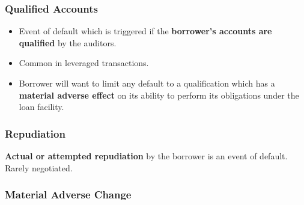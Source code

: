 \documentclass[
]{article}
\providecommand{\tightlist}{%
  \setlength{\itemsep}{0pt}\setlength{\parskip}{0pt}}
\begin{document}
\hypertarget{qualified-accounts}{%
\subsubsection{Qualified Accounts}\label{qualified-accounts}}

\begin{itemize}
\tightlist
\item
  Event of default which is triggered if the \textbf{borrower's accounts
  are qualified} by the auditors.
\item
  Common in leveraged transactions.
\item
  Borrower will want to limit any default to a qualification which has a
  \textbf{material adverse effect} on its ability to perform its
  obligations under the loan facility.
\end{itemize}

\hypertarget{repudiation}{%
\subsubsection{Repudiation}\label{repudiation}}

\textbf{Actual or attempted repudiation} by the borrower is an event of
default. Rarely negotiated.

\hypertarget{material-adverse-change}{%
\subsubsection{Material Adverse Change}\label{material-adverse-change}}
\end{document}
